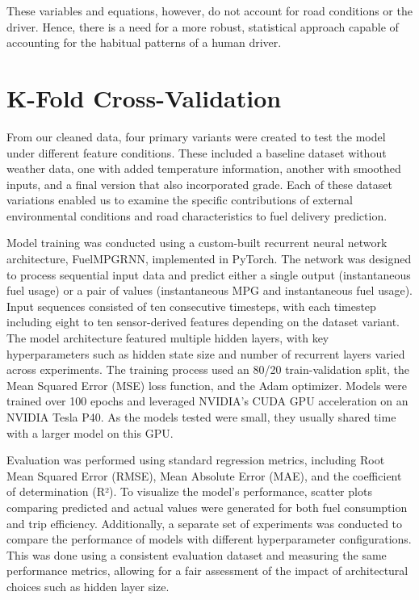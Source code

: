 \documentclass[letterpaper]{article}
\begin{document}
These variables and equations, however, do not account for road conditions 
or the driver. Hence, there is a need for a more robust, statistical 
approach capable of accounting for the habitual patterns of a human driver.

\section*{K-Fold Cross-Validation}

From our cleaned data, four primary variants were created to test the model 
under different feature conditions. These included a baseline dataset 
without weather data, one with added temperature information, another with 
smoothed inputs, and a final version that also incorporated grade. Each of 
these dataset variations enabled us to examine the specific contributions 
of external environmental conditions and road characteristics to fuel 
delivery prediction.

Model training was conducted using a custom-built recurrent neural network 
architecture, FuelMPGRNN, implemented in PyTorch. The network was designed 
to process sequential input data and predict either a single output 
(instantaneous fuel usage) or a pair of values (instantaneous MPG and 
instantaneous fuel usage). Input sequences consisted of ten consecutive 
timesteps, with each timestep including eight to ten sensor-derived 
features depending on the dataset variant. The model architecture featured 
multiple hidden layers, with key hyperparameters such as hidden state size 
and number of recurrent layers varied across experiments. The training 
process used an 80/20 train-validation split, the Mean Squared Error 
(MSE) loss function, and the Adam optimizer. Models were trained over 100 
epochs and leveraged NVIDIA's CUDA GPU acceleration on an NVIDIA Tesla P40. 
As the models tested were small, they usually shared time with a larger 
model on this GPU.

Evaluation was performed using standard regression metrics, including Root 
Mean Squared Error (RMSE), Mean Absolute Error (MAE), and the coefficient 
of determination (R²). To visualize the model's performance, scatter plots 
comparing predicted and actual values were generated for both fuel 
consumption and trip efficiency. Additionally, a separate set of 
experiments was conducted to compare the performance of models with 
different hyperparameter configurations. This was done using a consistent 
evaluation dataset and measuring the same performance metrics, allowing 
for a fair assessment of the impact of architectural choices such as 
hidden layer size.
\end{document}

